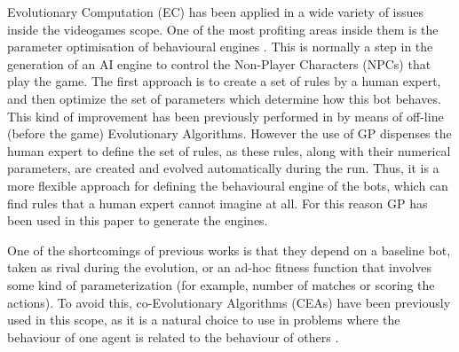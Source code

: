 \documentclass[conference]{IEEEtran}
\begin{document}
Evolutionary Computation (EC) has been applied in a wide variety of issues inside the videogames scope. One of the most profiting areas inside them is the parameter optimisation of behavioural engines \cite{Mora-Evo2010,cooperativebots_CIG2010,Genebot-IWANN2011}.
%
%
This is normally a step in the generation of an AI engine to control the Non-Player Characters (NPCs) that play the game. The first approach is to create a set of rules by a human expert, and then optimize the set of parameters which determine how this bot behaves. This kind of improvement has been previously performed in \cite{Genebot_CEC11,genebot-evo12,Genebot_CIG2012,CarSetup} by means of off-line (before the game) Evolutionary Algorithms.
However the use of GP \cite{GarciaGP14,EsparciaGP2013} dispenses the human expert to define the set of rules, as these rules, along with their numerical parameters, are created and evolved automatically during the run.  Thus, it is a more flexible approach for defining the behavioural engine of the bots, which can find rules that a human expert cannot imagine at all. For this reason GP has been used in this paper to generate the engines.


One of the shortcomings of previous works is that they depend on a baseline bot, taken as rival during the evolution, or an ad-hoc fitness function that involves some kind of parameterization (for example, number of matches or scoring the actions). To avoid this, co-Evolutionary Algorithms (CEAs)
have been previously used in this scope, as it is a natural choice to use in problems where the behaviour of one agent is related to the behaviour of others \cite{Coevolving13Samothrakis}.
\end{document}
